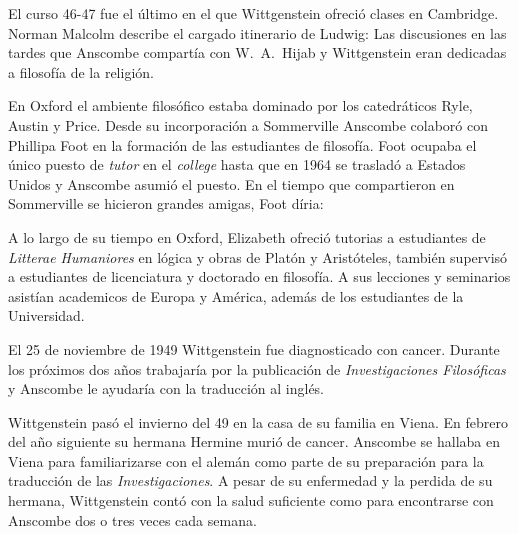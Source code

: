 El curso 46-47 fue el último en el que Wittgenstein ofreció clases en Cambridge. Norman Malcolm describe el cargado itinerario de Ludwig:  Las discusiones en las tardes que Anscombe compartía con W.~A.~Hijab y Wittgenstein eran dedicadas a filosofía de la religión.

En Oxford el ambiente filosófico estaba dominado por los catedráticos Ryle, Austin y Price. Desde su incorporación a Sommerville Anscombe colaboró con Phillipa Foot en la formación de las estudiantes de filosofía. Foot ocupaba el único puesto de \emph{tutor} en el \emph{college} hasta que en 1964 se trasladó a Estados Unidos y Anscombe asumió el puesto. En el tiempo que compartieron en Sommerville se hicieron grandes amigas, Foot díria: 

A lo largo de su tiempo en Oxford, Elizabeth ofreció tutorias a estudiantes de \emph{Litterae Humaniores} en lógica y obras de Platón y Aristóteles, también supervisó a estudiantes de licenciatura y doctorado en filosofía. A sus lecciones y seminarios asistían academicos de Europa y América, además de los estudiantes de la Universidad.\autocite[Cf.~][32]{teichman2002fellows}

El 25 de noviembre de 1949 Wittgenstein fue diagnosticado con cancer\autocite[cf.~][loc 11034]{monk}. Durante los próximos dos años trabajaría por la publicación de \emph{Investigaciones Filosóficas} y Anscombe le ayudaría con la traducción al inglés.

Wittgenstein pasó el invierno del 49 en la casa de su familia en Viena. En febrero del año siguiente su hermana Hermine murió de cancer. Anscombe se hallaba en Viena para familiarizarse con el alemán como parte de su preparación para la traducción de las \emph{Investigaciones}. A pesar de su enfermedad y la perdida de su hermana, Wittgenstein contó con la salud suficiente como para encontrarse con Anscombe dos o tres veces cada semana.\autocite[cf.~][loc 11138]{monk}

